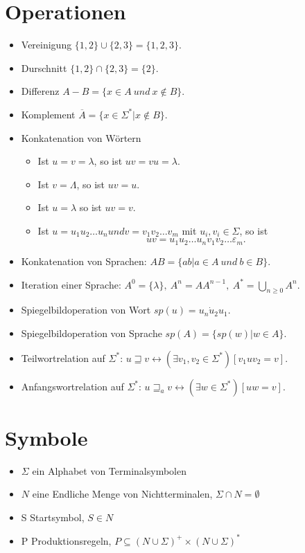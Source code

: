 \documentclass[9pt]{article}
\begin{document}
\section{Operationen}
\begin{itemize}
	\item Vereinigung $\{1, 2\} \cup \{2, 3\} = \{1, 2, 3\}$.
	\item Durschnitt $\{1, 2\} \cap \{2, 3\} = \{2\}$.
	\item Differenz $A - B = \{x \in A\ und\ x \notin B\}$.
	\item Komplement $\overline{A} = \{x \in \Sigma^*|x\notin B\}$.
	\item Konkatenation von Wörtern
	\begin{itemize}
		\item Ist $u = v = \lambda$, so ist $uv = vu = \lambda$.
		\item Ist $v = \Lambda$, so ist $uv = u$.
		\item Ist $u = \lambda$ so ist $uv = v$.
		\item Ist $u = u_1 u_2 \dots u_n und v = v_1 v_2 \dots v_m $ mit $u_i , v_i \in \Sigma$, so ist
		$$uv = u_1 u_2 \dots u_n v_1 v_2 \dots \varepsilon_m.$$
	\end{itemize}
	\item Konkatenation von Sprachen:
	$AB = \{ab|a\in A \ und\ b \in B\}.$
	\item Iteration einer Sprache:
	$A^0 = \{\lambda\},\ A^n = AA^{n-1},\ A^* = \bigcup_{n\geq 0}A^n$.
	\item Spiegelbildoperation von Wort $sp(u)=u_n \dot u_2 u_1$.
	\item Spiegelbildoperation von Sprache $sp(A)=\{sp(w)|w \in A\}$.
	\item Teilwortrelation auf $\Sigma^*$: 
	 $u \sqsupseteq v \leftrightarrow (\exists v_1, v_2 \in \Sigma^*)[v_1 u v_2 = v]$.
	 \item Anfangswortrelation auf $\Sigma^*$:
	 $ u \sqsupseteq_a v \leftrightarrow (\exists w \in \Sigma^*)[uw = v]$.
\end{itemize}
\section{Symbole}
\begin{itemize}
	\item $\Sigma$ ein Alphabet von Terminalsymbolen
	\item $N$ eine Endliche Menge von Nichtterminalen, $\Sigma \cap N = \emptyset$
	\item S Startsymbol, $S \in N$
	\item P Produktionsregeln, $P \subseteq (N \cup \Sigma)^+ \times (N \cup \Sigma)^*$
\end{itemize}
\end{document}
